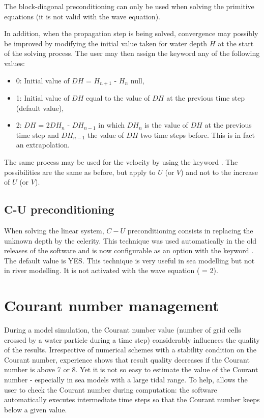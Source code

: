 The block-diagonal preconditioning can only be used
when solving the primitive equations (it is not valid with the wave equation).

In addition, when the propagation step is being solved,
convergence may possibly be improved by modifying the initial value taken
for water depth $H$ at the start of the solving process.
The user may then assign the keyword 
any of the following values:

\begin{itemize}
\item 0: Initial value of $DH$ = $H_{n+1}$ - $H_n$ null,

\item 1: Initial value of $DH$ equal to the value of $DH$
at the previous time step (default value),

\item 2: $DH$ = 2$DH_n$ - $DH_{n-1}$ in which $DH_n$ is the value of
$DH$ at the previous time step and $DH_{n-1}$ the value of $DH$ two time steps
before.
This is in fact an extrapolation.
\end{itemize}

The same process may be used for the velocity by using the keyword
.
The possibilities are the same as before, but apply to $U$ (or $V$)
and not to the increase of $U$ (or $V$).


\subsection{C-U preconditioning}

When solving the linear system, $C-U$ preconditioning consists
in replacing the unknown depth by the celerity.
This technique was used automatically in the old releases of the software
and is now configurable as an option with the keyword
.
The default value is YES.
This technique is very useful in sea modelling but not in river modelling.
It is not activated with the wave equation
( = 2).


\section{Courant number management}

During a model simulation, the Courant number value (number of grid cells
crossed by a water particle during a time step) considerably influences
the quality of the results.
Irrespective of numerical schemes with a stability condition on the Courant
number, experience shows that result quality decreases if the Courant number is
above 7 or 8.
Yet it is not so easy to estimate the value of the Courant number
- especially in sea models with a large tidal range.
To help,  allows the user to check the Courant number during
computation:
the software automatically executes intermediate time steps
so that the Courant number keeps below a given value.

